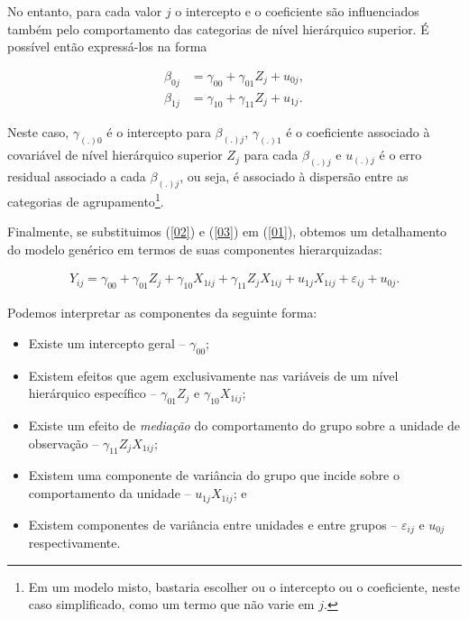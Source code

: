 \documentclass[
  letterpaper,
  DIV=11,
  numbers=noendperiod]{scrartcl}
\providecommand{\tightlist}{%
  \setlength{\itemsep}{0pt}\setlength{\parskip}{0pt}}\usepackage{longtable,booktabs,array}
\begin{document}
No entanto, para cada valor \(j\) o intercepto e o coeficiente são
influenciados também pelo comportamento das categorias de nível
hierárquico superior. É possível então expressá-los na forma

\begin{align}
  \beta_{0j} & = \gamma_{00} + \gamma_{01}Z_{j} + u_{0j}, \label{02} \\
  \beta_{1j} & = \gamma_{10} + \gamma_{11}Z_{j} + u_{1j}. \label{03}
\end{align}

Neste caso, \(\gamma_{(.)0}\) é o intercepto para \(\beta_{(.)j}\),
\(\gamma_{(.)1}\) é o coeficiente associado à covariável de nível
hierárquico superior \(Z_j\) para cada \(\beta_{(.)j}\) e \(u_{(.)j}\) é
o erro residual associado a cada \(\beta_{(.)j}\), ou seja, é associado
à dispersão entre as categorias de agrupamento\footnote{Em um modelo
  misto, bastaria escolher ou o intercepto ou o coeficiente, neste caso
  simplificado, como um termo que não varie em \(j\).}.

Finalmente, se substituimos (\ref{02}) e (\ref{03}) em (\ref{01}),
obtemos um detalhamento do modelo genérico em termos de suas componentes
hierarquizadas:

\begin{align}
  Y_{ij} = \gamma_{00} + \gamma_{01}Z_{j} + \gamma_{10}X_{1ij} + \gamma_{11}Z_{j}X_{1ij} + u_{1j}X_{1ij} + \varepsilon_{ij} + u_{0j}. \label{04}
\end{align}

Podemos interpretar as componentes da seguinte forma:

\begin{itemize}
\tightlist
\item
  Existe um intercepto geral -- \(\gamma_{00}\);
\item
  Existem efeitos que agem exclusivamente nas variáveis de um nível
  hierárquico específico -- \(\gamma_{01}Z_{j}\) e
  \(\gamma_{10}X_{1ij}\);
\item
  Existe um efeito de \emph{mediação} do comportamento do grupo sobre a
  unidade de observação -- \(\gamma_{11}Z_{j}X_{1ij}\);
\item
  Existem uma componente de variância do grupo que incide sobre o
  comportamento da unidade -- \(u_{1j}X_{1ij}\); e
\item
  Existem componentes de variância entre unidades e entre grupos --
  \(\varepsilon_{ij}\) e \(u_{0j}\) respectivamente.
\end{itemize}
\end{document}
